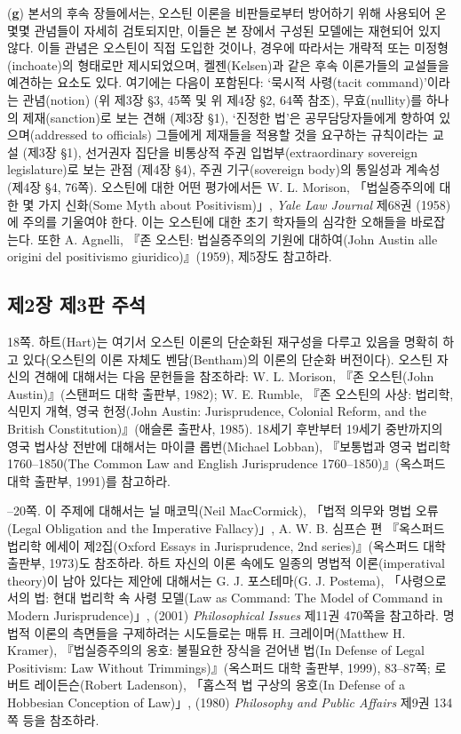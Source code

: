 {(\textbf{g})  본서의 후속
장들에서는, 오스틴 이론을 비판들로부터 방어하기 위해 사용되어 온 몇몇
관념들이 자세히 검토되지만, 이들은 본 장에서 구성된 모델에는 재현되어
있지 않다. 이들 관념은 오스틴이 직접 도입한 것이나, 경우에 따라서는
개략적 또는 미정형(inchoate)의 형태로만 제시되었으며, 켈젠(Kelsen)과
같은 후속 이론가들의 교설들을 예견하는 요소도 있다. 여기에는 다음이
포함된다: ‘묵시적 사령(tacit command)’이라는 관념(notion) (위 제3장 §3,
45쪽 및 위 제4장 §2, 64쪽 참조), 무효(nullity)를 하나의 제재(sanction)로
보는 견해 (제3장 §1), ‘진정한 법’은 공무담당자들에게 향하여
있으며(addressed to officials) 그들에게 제재들을 적용할 것을 요구하는
규칙이라는 교설 (제3장 §1), 선거권자 집단을 비통상적 주권
입법부(extraordinary sovereign legislature)로 보는 관점 (제4장 §4), 주권
기구(sovereign body)의 통일성과 계속성 (제4장 §4, 76쪽). 오스틴에 대한
어떤 평가에서든 W. L. Morison, 「법실증주의에 대한 몇 가지 신화(Some
Myth about Positivism)」, \emph{Yale Law Journal} 제68권 (1958)에 주의를
기울여야 한다. 이는 오스틴에 대한 초기 학자들의 심각한 오해들을
바로잡는다. 또한 A. Agnelli, 『존 오스틴: 법실증주의의 기원에
대하여(John Austin alle origini del positivismo giuridico)』(1959),
제5장도 참고하라.

\subsection{제2장 제3판
주석}\label{uxc81c2uxc7a5-uxc81c3uxd310-uxc8fcuxc11d}

\noteentry 18쪽.  하트(Hart)는 여기서 오스틴 이론의
단순화된 재구성을 다루고 있음을 명확히 하고 있다(오스틴의 이론 자체도
벤담(Bentham)의 이론의 단순화 버전이다). 오스틴 자신의 견해에 대해서는
다음 문헌들을 참조하라: W. L. Morison, 『존 오스틴(John
Austin)』(스탠퍼드 대학 출판부, 1982); W. E. Rumble, 『존 오스틴의 사상:
법리학, 식민지 개혁, 영국 헌정(John Austin: Jurisprudence, Colonial
Reform, and the British Constitution)』(애슬론 출판사, 1985). 18세기
후반부터 19세기 중반까지의 영국 법사상 전반에 대해서는 마이클
롭번(Michael Lobban), 『보통법과 영국 법리학 1760--1850(The Common Law
and English Jurisprudence 1760--1850)』(옥스퍼드 대학 출판부, 1991)를
참고하라.

--20쪽.  이 주제에 대해서는 닐
매코믹(Neil MacCormick), 「법적 의무와 명법 오류(Legal Obligation and
the Imperative Fallacy)」, A. W. B. 심프슨 편 『옥스퍼드 법리학 에세이
제2집(Oxford Essays in Jurisprudence, 2nd series)』(옥스퍼드 대학
출판부, 1973)도 참조하라. 하트 자신의 이론 속에도 일종의 명법적
이론(imperatival theory)이 남아 있다는 제안에 대해서는 G. J. 포스테마(G.
J. Postema), 「사령으로서의 법: 현대 법리학 속 사령 모델(Law as Command:
The Model of Command in Modern Jurisprudence)」, (2001)
\emph{Philosophical Issues} 제11권 470쪽을 참고하라. 명법적 이론의
측면들을 구제하려는 시도들로는 매튜 H. 크레이머(Matthew H. Kramer),
『법실증주의의 옹호: 불필요한 장식을 걷어낸 법(In Defense of Legal
Positivism: Law Without Trimmings)』(옥스퍼드 대학 출판부, 1999),
83--87쪽; 로버트 레이든슨(Robert Ladenson), 「홉스적 법 구상의 옹호(In
Defense of a Hobbesian Conception of Law)」, (1980) \emph{Philosophy and
Public Affairs} 제9권 134쪽 등을 참조하라.

}
